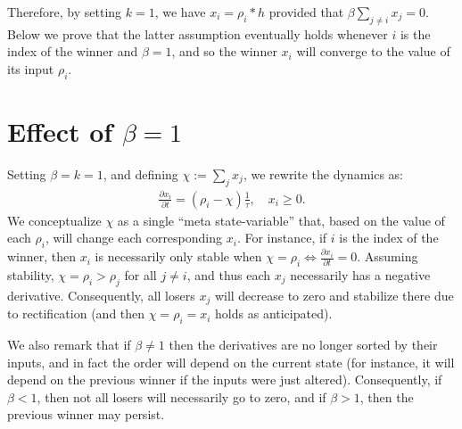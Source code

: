 Therefore, by setting $k = 1$, we have $x_i = \rho_i \ast h$ provided that $\beta \sum_{j \ne i} x_j = 0$.
Below we prove that the latter assumption eventually holds whenever $i$ is the index of the winner and $\beta = 1$, and so the winner $x_i$ will converge to the value of its input $\rho_i$.


\section{Effect of \texorpdfstring{$\beta = 1$}{β=1}}

Setting $\beta = k = 1$, and defining $\chi := \sum_j x_j$, we rewrite the dynamics as:
\begin{equation} \label{eq:um-special}
    \begin{split}
        \frac{{\partial x}_i}{\partial t} = \left(\rho_i - \chi \right) \frac{1}{\tau}, \quad x_i \ge 0.
    \end{split}
\end{equation}
We conceptualize $\chi$ as a single ``meta state-variable'' that, based on the value of each $\rho_i$, will change each corresponding $x_i$.
For instance, if $i$ is the index of the winner, then $x_i$ is necessarily only stable when $\chi = \rho_i \iff \frac{{\partial x}_i}{\partial t} = 0$.
Assuming stability, $\chi = \rho_i > \rho_j$ for all $j \ne i$, and thus each $x_j$ necessarily has a negative derivative.
Consequently, all losers $x_j$ will decrease to zero and stabilize there due to rectification (and then $\chi = \rho_i = x_i$ holds as anticipated).

We also remark that if $\beta \ne 1$ then the derivatives are no longer sorted by their inputs, and in fact the order will depend on the current state (for instance, it will depend on the previous winner if the inputs were just altered). Consequently, if $\beta < 1$, then not all losers will necessarily go to zero, and if $\beta > 1$, then the previous winner may persist.
